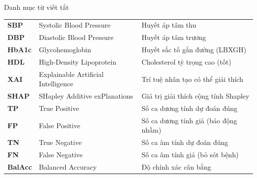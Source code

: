 \documentclass{uetgraduation}
\begin{document}
\begin{contentlisting}
\begin{contentlistingsection}{Danh mục từ viết tắt}
\begin{longtable}{p{2.0cm} p{6.4cm} p{6.4cm}}
\textbf{SBP}    & Systolic Blood Pressure & Huyết áp tâm thu \\
\textbf{DBP}    & Diastolic Blood Pressure & Huyết áp tâm trương \\
\textbf{HbA1c}  & Glycohemoglobin & Huyết sắc tố gắn đường (LBXGH) \\
\textbf{HDL}    & High-Density Lipoprotein & Cholesterol tỷ trọng cao (tốt) \\
\textbf{XAI}    & Explainable Artificial Intelligence & Trí tuệ nhân tạo có thể giải thích \\
\textbf{SHAP}   & SHapley Additive exPlanations & Giá trị giải thích cộng tính Shapley \\
\textbf{TP}     & True Positive & Số ca dương tính dự đoán đúng \\
\textbf{FP}     & False Positive & Số ca dương tính giả (báo động nhầm) \\
\textbf{TN}     & True Negative & Số ca âm tính dự đoán đúng \\
\textbf{FN}     & False Negative & Số ca âm tính giả (bỏ sót bệnh) \\
\textbf{BalAcc} & Balanced Accuracy & Độ chính xác cân bằng \\
\end{longtable}
\end{contentlistingsection}
\end{contentlisting}







\appendix

\end{document}
